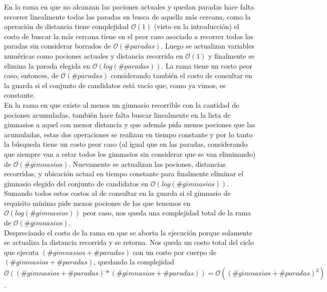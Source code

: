     En la rama en que no alcanzan las pociones actuales y quedan paradas hace falta recorrer linealmente todas las paradas en busca de aquella más cercana, como la operación de distancia tiene complejidad $\mathcal{O}(1)$ (visto en la introducción) el costo de buscar la más cercana tiene en el peor caso asociado a recorrer todas las paradas sin considerar borrados de $\mathcal{O}(\#paradas)$. Luego se actualizan variables numéricas como pociones actuales y distancia recorrida en $\mathcal{O}(1)$ y finalmente se elimina la parada elegida en $\mathcal{O}(log(\#paradas))$. La rama tiene un costo peor caso, entonces, de $\mathcal{O}(\#paradas)$ considerando también el costo de consultar en la guarda si el conjunto de candidatos está vacío que, como ya vimos, es constante.
    \\

    En la rama en que existe al menos un gimnasio recorrible con la cantidad de pociones acumuladas, también hace falta buscar linealmente en la lista de gimnasios a aquel con menor distancia y que además pida menos pociones que las acumuladas, estas dos operaciones se realizan en tiempo constante y por lo tanto la búsqueda tiene un costo peor caso (al igual que en las paradas, considerando que siempre van a estar todos los gimnasios sin considerar que se van eliminando) de $\mathcal{O}(\#gimnasios)$. Nuevamente se actualizan las pociones, distancias recorridas, y ubicación actual en tiempo constante para finalmente eliminar el gimnasio elegido del conjunto de candidatos en $\mathcal{O}(log(\#gimnasios))$. Sumando todos estos costos al de consultar en la guarda si el gimnasio de requisito mínimo pide menos pociones de las que tenemos en $\mathcal{O}(log(\#gimnasios))$ peor caso, nos queda una complejidad total de la rama de $\mathcal{O}(\#gimnasios)$.
    \\

    Despreciando el costo de la rama en que se aborta la ejecución porque solamente se actualiza la distancia recorrida y se retorna. Nos queda un costo total del ciclo que ejecuta $(\#gimnasios+\#paradas)$ con un costo por cuerpo de $(\#gimnasios+\#paradas)$, quedando la complejidad $\mathcal{O}((\#gimnasios+\#paradas) * (\#gimnasios+\#paradas)) = \mathcal{O}((\#gimnasios+\#paradas)^2)$.
